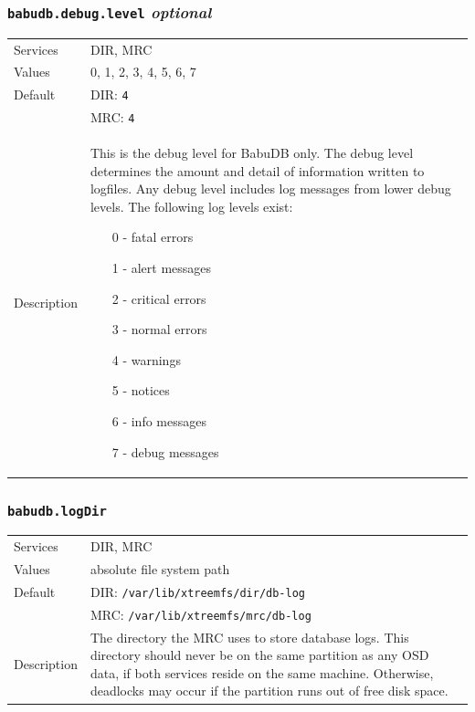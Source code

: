 \documentclass[a4paper,10pt]{book}
\begin{document}
\subsubsection{\texttt{babudb.debug.level} \textit{optional}}
\begin{tabular}{lp{10cm}}
 Services & DIR, MRC\\
 Values   & 0, 1, 2, 3, 4, 5, 6, 7 \\
 Default  & DIR: \texttt{4}\\
		  & MRC: \texttt{4}\\
 Description & This is the debug level for BabuDB only. The debug level determines the amount and detail of information written to logfiles. Any debug level includes log messages from lower debug levels. The following log levels exist:
\begin{enumerate}
 \item[0 -] fatal errors
 \item[1 -] alert messages
 \item[2 -] critical errors
 \item[3 -] normal errors
 \item[4 -] warnings
 \item[5 -] notices
 \item[6 -] info messages
 \item[7 -] debug messages
\end{enumerate}
\end{tabular}

\subsubsection{\texttt{babudb.logDir}}
\begin{tabular}{lp{10cm}}
 Services & DIR, MRC\\
 Values   & absolute file system path\\
 Default  & DIR: \texttt{/var/lib/xtreemfs/dir/db-log}\\
          & MRC: \texttt{/var/lib/xtreemfs/mrc/db-log}\\
 Description & The directory the MRC uses to store database logs. This directory should never be on the same partition as any OSD data, if both services reside on the same machine. Otherwise, deadlocks may occur if the partition runs out of free disk space.
\end{tabular}
\end{document}

